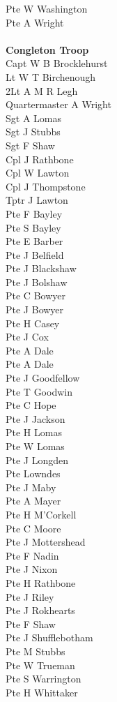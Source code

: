 \begin{multicols}{2}
  Pte W Washington \\
  Pte A Wright \\
  \\
  \textbf{Congleton Troop} \\
  Capt W B Brocklehurst \\
  Lt W T Birchenough \\
  2Lt A M R Legh \\
  Quartermaster A Wright \\
  Sgt A Lomas \\
  Sgt J Stubbs \\
  Sgt F Shaw \\
  Cpl J Rathbone \\
  Cpl W Lawton \\
  Cpl J Thompstone \\
  Tptr J Lawton \\
  Pte F Bayley \\
  Pte S Bayley \\
  Pte E Barber \\
  Pte J Belfield \\
  Pte J Blackshaw \\
  Pte J Bolshaw \\
  Pte C Bowyer \\
  Pte J Bowyer \\
  Pte H Casey \\
  Pte J Cox \\
  Pte A Dale \\
  Pte A Dale \\
  Pte J Goodfellow \\
  Pte T Goodwin \\
  Pte C Hope \\
  Pte J Jackson \\
  Pte H Lomas \\
  Pte W Lomas \\
  Pte J Longden \\
  Pte Lowndes \\
  Pte J Maby \\
  Pte A Mayer \\
  Pte H M'Corkell \\
  Pte C Moore \\
  Pte J Mottershead \\
  Pte F Nadin \\
  Pte J Nixon \\
  Pte H Rathbone \\
  Pte J Riley \\
  Pte J Rokhearts \\
  Pte F Shaw \\
  Pte J Shufflebotham \\
  Pte M Stubbs \\
  Pte W Trueman \\
  Pte S Warrington \\
  Pte H Whittaker \\
\end{multicols}

